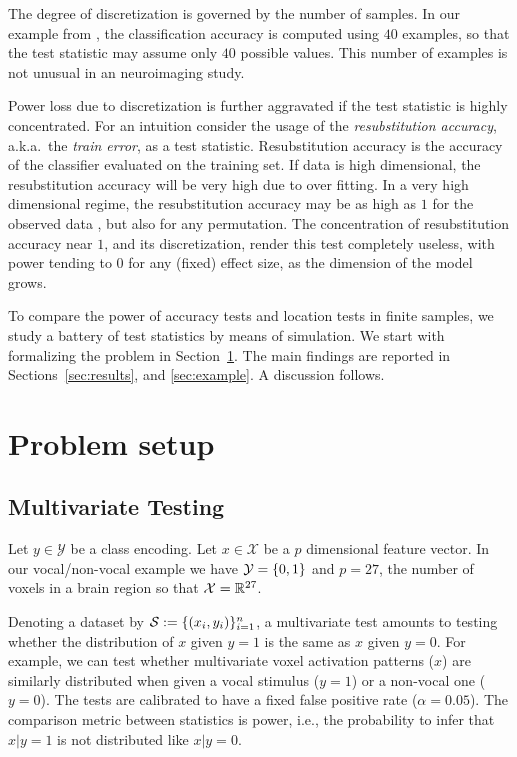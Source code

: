 \documentclass[12pt,a4paper]{article}
\begin{document}
The degree of discretization is governed by the number of samples. 
In our example from \citet{gilron_quantifying_2016}, the classification accuracy is computed using $40$ examples, so that the test statistic may assume only $40$ possible values. 
This number of examples is not unusual in an neuroimaging study. 

Power loss due to discretization is further aggravated if the test statistic is highly concentrated. 
For an intuition consider the usage of the \emph{resubstitution accuracy}, a.k.a.\ the \emph{train error}, as a test statistic. 
Resubstitution accuracy is the accuracy of the classifier evaluated on the training set.
If data is high dimensional, the resubstitution accuracy will be very high due to over fitting. 
In a very high dimensional regime, the resubstitution accuracy may be as high as $1$ for the observed data \cite[Theorem 1]{mclachlan_bias_1976}, but also for any permutation.
The concentration of resubstitution accuracy near $1$, and its discretization, render this test completely useless, with power tending to $0$ for any (fixed) effect size, as the dimension of the model grows. 


To compare the power of accuracy tests and location tests in finite samples, we study a battery of test statistics by means of simulation. 
We start with formalizing the problem in Section~\ref{sec:problem_setup}.
The main findings are reported in Sections~\ref{sec:results}, and \ref{sec:example}.
A discussion follows. 



\section{Problem setup}
\label{sec:problem_setup}


\subsection{Multivariate Testing}

Let $y \in \mathcal{Y}$ be a class encoding. 
Let $x \in \mathcal{X}$ be a $p$ dimensional feature vector. 
In our vocal/non-vocal example we have $\mathcal{Y}=\{ 0,1 \}$ and $p=27$, the number of voxels in a brain region so that $\mathcal{X}=\mathbb{R}^{27}$. 

Denoting a dataset by $\mathcal{S}:=\{(x_i,y_i)\}_{i=1}^n$, a multivariate test amounts to testing whether the distribution of $x$ given $y=1$ is the same as $x$ given $y=0$. 
For example, we can test whether multivariate voxel activation patterns ($x$) are similarly distributed when given a vocal stimulus ($y=1$) or a non-vocal one ($y=0$).
The tests are calibrated to have a fixed false positive rate ($\alpha=0.05$).
The comparison metric between statistics is power, i.e., the probability to infer that $x|y=1$ is not distributed like $x|y=0$.
\end{document}
